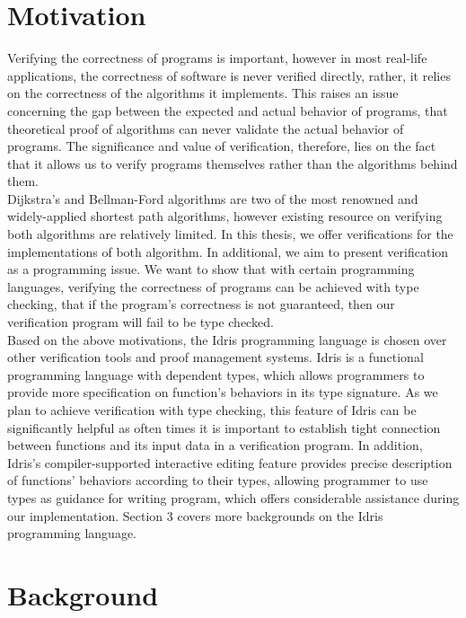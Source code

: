 \documentclass[11pt, a4paper]{article} %
\theoremstyle{definition}
\begin{document}
\section{Motivation}
Verifying the correctness of programs is important, however in most real-life applications, the correctness of software is never verified directly, rather, it relies on the correctness of the algorithms it implements. This raises an issue concerning the gap between the expected and actual behavior of programs, that theoretical proof of algorithms can never validate the actual behavior of programs. The significance and value of verification, therefore, lies on the fact that it allows us to verify programs themselves rather than the algorithms behind them. 
\\ 

Dijkstra's and Bellman-Ford algorithms are two of the most renowned and widely-applied shortest path algorithms, however existing resource on verifying both algorithms are relatively limited. In this thesis, we offer verifications for the implementations of both algorithm. In additional, we aim to present verification as a programming issue. We want to show that with certain programming languages, verifying the correctness of programs can be achieved with type checking, that if the program's correctness is not guaranteed, then our verification program will fail to be type checked.
\\

Based on the above motivations, the Idris programming language is chosen over other verification tools and proof management systems. Idris is a functional programming language with dependent types, which allows programmers to provide more specification on function's behaviors in its type signature. As we plan to achieve verification with type checking, this feature of Idris can be significantly helpful as often times it is important to establish tight connection between functions and its input data in a verification program. In addition, Idris's compiler-supported interactive editing feature provides precise description of functions' behaviors according to their types, allowing programmer to use types as guidance for writing program, which offers considerable assistance during our implementation. Section 3 covers more backgrounds on the Idris programming language. 

\section{Background}
\end{document}
